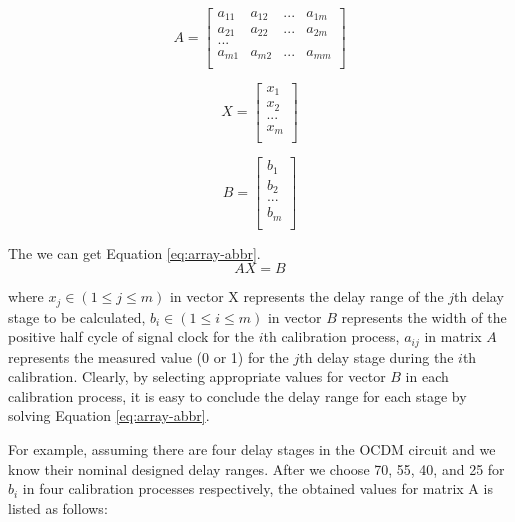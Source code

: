 \begin{equation}
    A=
    \left[
    \begin{array}
        {cccc}
        a_{11} & a_{12} & ... & a_{1m}\\
        a_{21} & a_{22} & ... & a_{2m}\\
        ... & & & \\
        a_{m1} & a_{m2} & ... & a_{mm}\\
    \end{array}
    \right]
\end{equation}

\begin{equation}
    X=
    \left[
    \begin{array}
        {c}
        x_{1} \\
        x_{2} \\
        ... \\
        x_{m} \\
    \end{array}
    \right]
\end{equation}

\begin{equation}
    B=
    \left[
    \begin{array}
        {c}
        b_{1} \\
        b_{2} \\
        ... \\
        b_{m} \\
    \end{array}
    \right]
\end{equation}


The we can get Equation \ref{eq:array-abbr}.
\begin{equation} \label{eq:array-abbr}
    AX=B
\end{equation}

where $x_{j} \in (1 \leq j \leq m)$ in vector X represents the delay range of the $j$th delay stage to be calculated, $b_{i} \in (1 \leq i \leq m)$ in vector $B$ represents the width of the positive half cycle of signal clock for the $i$th calibration process, $a_{ij}$ in  matrix $A$ represents the measured value (0 or 1) for the $j$th delay stage during the $i$th calibration. Clearly, by selecting appropriate values for vector $B$ in each calibration process, it is easy to conclude the delay range for each stage by solving Equation \ref{eq:array-abbr}.

For example, assuming there are four delay stages in the OCDM circuit and we know their nominal designed delay ranges. After we choose 70, 55, 40, and 25 for $b_{i}$ in four calibration processes respectively, the obtained values for matrix A is listed as follows:

